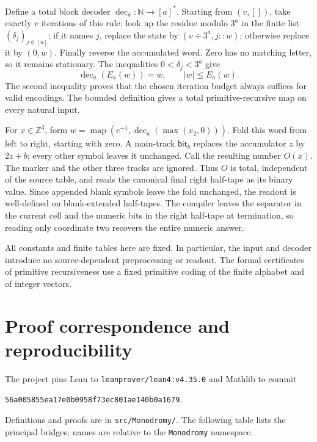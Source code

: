 \documentclass[11pt]{article}
\numberwithin{equation}{section}
\theoremstyle{definition}
\theoremstyle{remark}
\newcommand{\N}{\mathbb N}
\newcommand{\Z}{\mathbb Z}
\newcommand{\code}[1]{\nolinkurl{#1}}
\begin{document}
Define a total block decoder $\operatorname{dec}_a:\N\to[a]^*$.
Starting from $(v,[])$, take exactly $v$ iterations of this rule:
look up the residue modulo $3^a$ in the finite list
$(\delta_j)_{j\in[a]}$; if it names $j$, replace the state by
$(v\div3^a,j::w)$; otherwise replace it by $(0,w)$.
Finally reverse the accumulated word. Zero has no matching letter,
so it remains stationary. The inequalities
$0<\delta_j<3^a$ give
\[
 \operatorname{dec}_a(E_a(w))=w,\qquad |w|\leq E_a(w).
\]
The second inequality proves that the chosen iteration budget always
suffices for valid encodings. The bounded definition gives a total
primitive-recursive map on every natural input.

For $x\in\Z^3$, form
$w=\operatorname{map}(e^{-1},\operatorname{dec}_a(\max(x_2,0)))$.
Fold this word from left to right, starting with zero. A main-track
$\mathsf{bit}_b$ replaces the accumulator $z$ by $2z+b$;
every other symbol leaves it unchanged. Call the resulting number
$O(x)$. The marker and the other three tracks are ignored.
Thus $O$ is total, independent of the source table, and reads the
canonical final right half-tape as its binary value. Since appended
blank symbols leave the fold unchanged, the readout is well-defined
on blank-extended half-tapes. The compiler leaves the separator in
the current cell and the numeric bits in the right half-tape at
termination, so reading only coordinate two recovers the entire
numeric answer.

All constants and finite tables here are fixed. In particular, the
input and decoder introduce no source-dependent preprocessing or
readout. The formal certificates of primitive recursiveness use a
fixed primitive coding of the finite alphabet and of integer vectors.

\section{Proof correspondence and reproducibility}\label{app:lean}

The project pins Lean to \code{leanprover/lean4:v4.35.0} and Mathlib
to commit
\begin{center}\small\code{56a005855ea17e0b0958f73ec801ae140b0a1679}.\end{center}
Definitions and proofs are in \code{src/Monodromy/}. The following
table lists the principal bridges; names are relative to the
\code{Monodromy} namespace.
\end{document}
